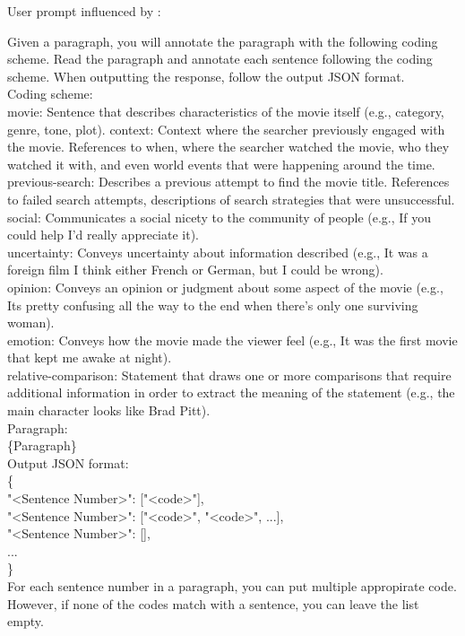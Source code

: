 \noindent
User prompt influenced by \citet{arguello-movie-identification}:
\begin{tcolorbox}
Given a paragraph, you will annotate the paragraph with the following coding scheme. Read the paragraph and annotate each sentence following the coding scheme.
When outputting the response, follow the output JSON format.\\

Coding scheme:\\
movie: Sentence that describes characteristics of the movie itself (e.g., category, genre, tone, plot).
context: Context where the searcher previously engaged with the movie. References to when, where the searcher watched the movie, who they watched it with, and even world events that were happening around the time.\\
previous-search: Describes a previous attempt to find the movie title. References to failed search attempts, descriptions of search strategies that were unsuccessful.\\
social: Communicates a social nicety to the community of people (e.g., If you could help I’d really appreciate it).\\
uncertainty: Conveys uncertainty about information described (e.g., It was a foreign film I think either French or German, but I could be wrong).\\
opinion: Conveys an opinion or judgment about some aspect of the movie (e.g., Its pretty confusing all the way to the end when there’s only one surviving woman).\\
emotion: Conveys how the movie made the viewer feel (e.g., It was the first movie that kept me awake at night).\\
relative-comparison: Statement that draws one or more comparisons that require additional information in order to extract the meaning of the statement (e.g., the main character looks like Brad Pitt).\\

Paragraph:\\
\{Paragraph\}\\

Output JSON format:\\
\{\\
"<Sentence Number>": ["<code>"],\\
"<Sentence Number>": ["<code>", "<code>", ...],\\
"<Sentence Number>": [],\\
...\\
\}\\

For each sentence number in a paragraph, you can put multiple appropirate code. However, if none of the codes match with a sentence, you can leave the list empty.
\end{tcolorbox}
